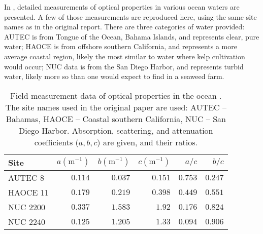 In \citep{petzold_volume_1972}, detailed measurements of optical properties in various ocean waters are presented.
A few of those measurements are reproduced here, using the same site names as in the original report.
There are three categories of water provided: AUTEC is from Tongue of the Ocean, Bahama Islands,
and represents clear, pure water; HAOCE is from offshore southern California, and represents a more average coastal region,
likely the most similar to water where kelp cultivation would occur; NUC data is from the San Diego Harbor, and represents turbid water,
likely more so than one would expect to find in a seaweed farm.

\begin{table}
  \centering
  \caption{Field measurement data of optical properties in the ocean \cite{petzold_volume_1972}.
    The site names used in the original paper are used: AUTEC -- Bahamas, HAOCE -- Coastal southern California, NUC -- San Diego Harbor.
    Absorption, scattering, and attenuation coefficients ($a,b,c$) are given, and their ratios.
  }
  \begin{tabular}{lrrrrr}
    \toprule
    Site & $a (\mbox{m}^{-1})$ & $b (\mbox{m}^{-1})$ & $c(\mbox{m}^{-1} )$ & $a/c$ & $b/c$ \\
    \midrule
    AUTEC 8 & $0.114$ & $0.037$ & $0.151$ & $0.753$ & $0.247$ \\
    HAOCE 11 & $0.179$ & $0.219$ & $0.398$ & $0.449$ & $0.551$ \\
    NUC 2200 & $0.337$ & $1.583$ & $1.92$ & $0.176$ & $0.824$ \\
    NUC 2240 & $0.125$ & $1.205$ & $1.33$ & $0.094$ & $0.906$ \\
    \bottomrule
  \end{tabular}
  \label{tab:petzold}
\end{table}

